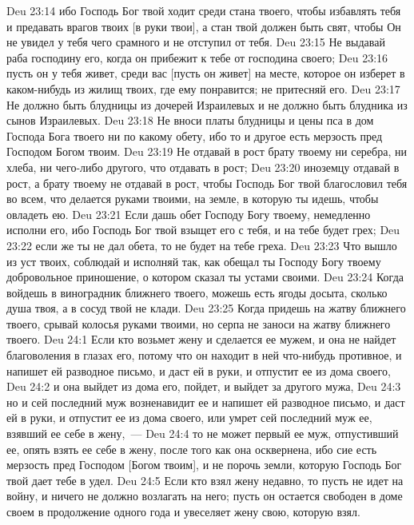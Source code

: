 \vs Deu 23:14 ибо Господь Бог твой ходит среди стана твоего, чтобы избавлять тебя и предавать врагов твоих [в руки твои], а  стан твой должен быть свят, чтобы Он не увидел у тебя чего срамного и не отступил от тебя.
\rsbpar\vs Deu 23:15 Не выдавай раба господину его, когда он прибежит к тебе от господина своего;
\vs Deu 23:16 пусть он у тебя живет, среди вас [пусть он живет] на месте, которое он изберет в каком-нибудь из жилищ твоих, где ему понравится; не притесняй его.
\rsbpar\vs Deu 23:17 Не должно быть блудницы из дочерей Израилевых и не должно быть блудника из сынов Израилевых.
\vs Deu 23:18 Не вноси платы блудницы и цены пса в дом Господа Бога твоего ни по какому обету, ибо то и другое есть мерзость пред Господом Богом твоим.
\rsbpar\vs Deu 23:19 Не отдавай в рост брату твоему ни серебра, ни хлеба, ни чего-либо другого, что  отдавать в рост;
\vs Deu 23:20 иноземцу отдавай в рост, а брату твоему не отдавай в рост, чтобы Господь Бог твой благословил тебя во всем, что делается руками твоими, на земле, в которую ты идешь, чтобы овладеть ею.
\rsbpar\vs Deu 23:21 Если дашь обет Господу Богу твоему, немедленно исполни его, ибо Господь Бог твой взыщет его с тебя, и на тебе будет грех;
\vs Deu 23:22 если же ты не дал обета, то не будет на тебе греха.
\vs Deu 23:23 Что вышло из уст твоих, соблюдай и исполняй так, как обещал ты Господу Богу твоему добровольное приношение, о котором сказал ты устами своими.
\rsbpar\vs Deu 23:24 Когда войдешь в виноградник ближнего твоего, можешь есть ягоды досыта, сколько  душа твоя, а в сосуд твой не клади.
\vs Deu 23:25 Когда придешь на жатву ближнего твоего, срывай колосья руками твоими, но серпа не заноси на жатву ближнего твоего.
\vs Deu 24:1 Если кто возьмет жену и сделается ее мужем, и она не найдет благоволения в глазах его, потому что он находит в ней что-нибудь противное, и напишет ей разводное письмо, и даст ей в руки, и отпустит ее из дома своего,
\vs Deu 24:2 и она выйдет из дома его, пойдет, и выйдет за другого мужа,
\vs Deu 24:3 но и сей последний муж возненавидит ее и напишет ей разводное письмо, и даст ей в руки, и отпустит ее из дома своего, или умрет сей последний муж ее, взявший ее себе в жену,~---
\vs Deu 24:4 то не может первый ее муж, отпустивший ее, опять взять ее себе в жену, после того как она осквернена, ибо сие есть мерзость пред Господом [Богом твоим], и не порочь земли, которую Господь Бог твой дает тебе в удел.
\rsbpar\vs Deu 24:5 Если кто взял жену недавно, то пусть не идет на войну, и ничего не должно возлагать на него; пусть он остается свободен в доме своем в продолжение одного года и увеселяет жену свою, которую взял.
